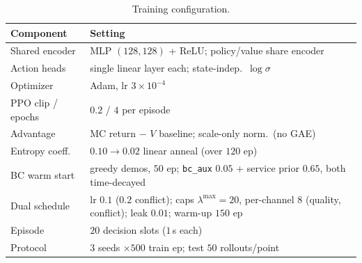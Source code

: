 \begin{table}[t]
\centering
\caption{Training configuration.}
\label{tab:train}
\footnotesize
\begin{tabular}{@{}l>{\raggedright\arraybackslash}p{5.4cm}@{}}
\toprule
Component & Setting \\
\midrule
Shared encoder & MLP $(128,128)$ + ReLU; policy/value share encoder \\
Action heads & single linear layer each; state-indep.\ $\log\sigma$ \\
Optimizer & Adam, lr $3\times10^{-4}$ \\
PPO clip / epochs & $0.2$ / $4$ per episode \\
Advantage & MC return $-$ $V$ baseline; scale-only norm.\ (no GAE) \\
Entropy coeff. & $0.10\to0.02$ linear anneal (over $120$ ep) \\
BC warm start & greedy demos, $50$ ep; \texttt{bc\_aux} $0.05$ + service prior $0.65$, both time-decayed \\
Dual schedule & lr $0.1$ ($0.2$ conflict); caps $\lambda^{\max}{=}20$, per-channel $8$ (quality, conflict); leak $0.01$; warm-up $150$ ep \\
Episode & $20$ decision slots ($1$\,s each) \\
Protocol & $3$ seeds $\times500$ train ep; test $50$ rollouts/point \\
\bottomrule
\end{tabular}
\end{table}

